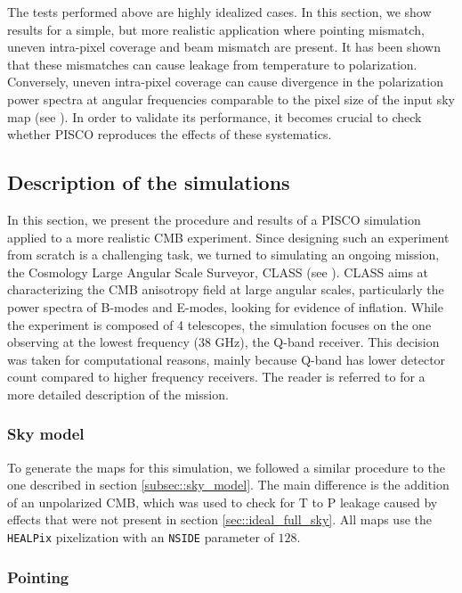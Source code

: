 \documentclass[a4paper,11pt]{article}
\begin{document}
The tests performed above are highly idealized cases. In this section, we show results for a simple, but more realistic application where pointing mismatch, uneven intra-pixel coverage and beam mismatch are present. It has been shown that these mismatches can cause leakage from temperature to polarization. Conversely, uneven intra-pixel coverage can cause divergence in the polarization power spectra at angular frequencies comparable to the pixel size of the input sky map (see \cite{2005poutanen}). In order to validate its performance, it becomes crucial to check whether PISCO reproduces the effects of these systematics.
 
\subsection{Description of the simulations}

In this section, we present the procedure and results of a PISCO simulation applied to a more realistic CMB experiment. Since designing such an experiment from scratch is a challenging task, we turned to simulating an ongoing mission, the Cosmology Large Angular Scale Surveyor, CLASS (see \cite{2014SPIE.9153E..1IE}). CLASS aims at characterizing the CMB anisotropy field at large angular scales, particularly the power spectra of B-modes and E-modes, looking for evidence of inflation. While the experiment is composed of 4 telescopes, the simulation focuses on the one observing at the lowest frequency (38 GHz), the Q-band receiver. This decision was taken for computational reasons, mainly because Q-band has lower detector count compared to higher frequency receivers. The reader is referred to \cite{2016SPIE.9914E..1KH} for a more detailed description of the mission.

\subsubsection{Sky model}

To generate the maps for this simulation, we followed a similar procedure to the one described in section \ref{subsec::sky_model}. The main difference is the addition of an unpolarized CMB, which was used to check for T to P leakage caused by effects that were not present in section \ref{sec::ideal_full_sky}. All maps use the \texttt{HEALPix} pixelization with an \texttt{NSIDE} parameter of $128$. 

\subsubsection{Pointing}
\end{document}
